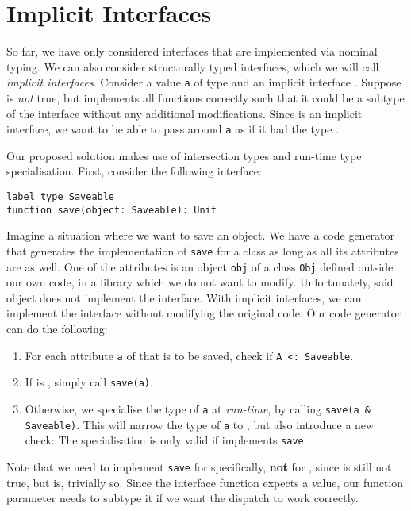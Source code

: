 \section{Implicit Interfaces}

So far, we have only considered interfaces that are implemented via nominal typing. We can also consider structurally typed interfaces, which we will call \textit{implicit interfaces}. Consider a value \texttt{a} of type  and an implicit interface . Suppose  is \textit{not} true, but  implements all functions correctly such that it could be a subtype of the interface without any additional modifications. Since  is an implicit interface, we want to be able to pass around \texttt{a} as if it had the type .

Our proposed solution makes use of intersection types and run-time type specialisation. First, consider the following interface:

\begin{lstlisting}
label type Saveable
function save(object: Saveable): Unit
\end{lstlisting}

\noindent Imagine a situation where we want to save an object. We have a code generator that generates the implementation of \texttt{save} for a  class as long as all its attributes are  as well. One of the attributes is an object \texttt{obj} of a class \texttt{Obj} defined outside our own code, in a library which we do not want to modify. Unfortunately, said object does not implement the  interface. With implicit interfaces, we can implement the interface without modifying the original code. Our code generator can do the following:

\begin{enumerate}
	\item For each attribute \texttt{a} of  that is to be saved, check if \texttt{A <: Saveable}.
	\item If  is , simply call \texttt{save(a)}.
	\item Otherwise, we specialise the type of \texttt{a} at \textit{run-time}, by calling \texttt{save(a \& Saveable)}. This will narrow the type of \texttt{a} to , but also introduce a new check: The specialisation is only valid if  implements \texttt{save}.
\end{enumerate}

\noindent Note that we need to implement \texttt{save} for  specifically, \textbf{not} for , since  is still not true, but  is, trivially so. Since the interface function expects a  value, our function parameter needs to subtype it if we want the dispatch to work correctly.

